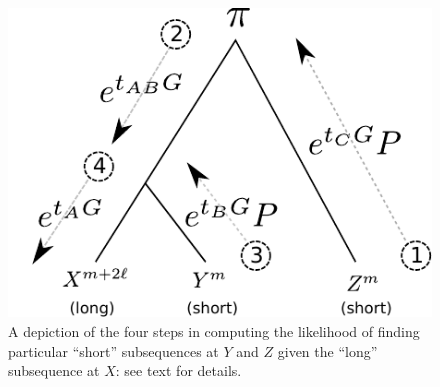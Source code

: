 \documentclass{article}
\theoremstyle{plain}
\theoremstyle{definition}
\begin{document}
\begin{figure}
    \begin{center}
    \includegraphics{peeling-schematic}
    \end{center}
    \caption{
        A depiction of the four steps in computing the likelihood
        of finding particular ``short'' subsequences at $Y$ and $Z$
        given the ``long'' subsequence at $X$: see text for details.
        \label{fig:peeling}
    }
\end{figure}
\end{document}
